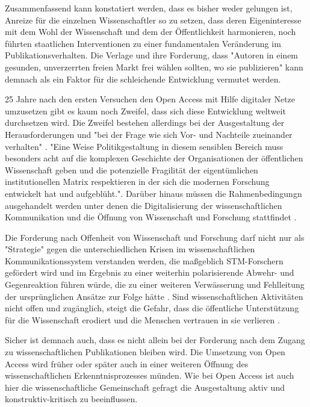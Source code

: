 Zusammenfassend kann konstatiert werden, dass es bisher weder gelungen ist, Anreize für die einzelnen Wissenschaftler so zu setzen, dass deren Eigeninteresse mit dem Wohl der Wissenschaft und dem der Öffentlichkeit harmonieren, noch führten staatlichen Interventionen zu einer fundamentalen Veränderung im Publikationsverhalten. Die Verlage und ihre Forderung, dass "Autoren in einem gesunden, unverzerrten freien Markt frei wählen sollten, wo sie publizieren" \cite{Brussels_Declaration_2007} kann demnach als ein Faktor für die schleichende Entwicklung vermutet werden.

25 Jahre nach den ersten Versuchen den Open Access mit Hilfe digitaler Netze umzusetzen gibt es kaum noch Zweifel, dass sich diese Entwicklung weltweit durchsetzen wird. Die Zweifel bestehen allerdings bei der Ausgestaltung der Herausforderungen und "bei der Frage wie sich Vor- und Nachteile zueinander verhalten" \cite{hagner_2015_sache_buches}. "Eine Weise Politikgestaltung in diesem sensiblen Bereich muss besonders acht auf die komplexen Geschichte der Organisationen der öffentlichen Wissenschaft geben und die potenzielle Fragilität der eigentümlichen institutionellen Matrix respektieren in der sich die modernen Forschung entwickelt hat und aufgeblüht."\cite{david1998_common}. Darüber hinaus müssen die Rahmenbedingungn ausgehandelt werden unter denen die Digitalisierung der wissenschaftlichen Kommunikation und die Öffnung von Wissenschaft und Forschung stattfindet \cite{mennes_2013_making_os}.

Die Forderung nach Offenheit von Wissenschaft und Forschung darf nicht nur als "Strategie" gegen die unterschiedlichen Krisen im wissenschaftlichen Kommunikationssystem verstanden werden, die maßgeblich STM-Forschern gefördert wird und im Ergebnis zu einer weiterhin polarisierende Abwehr- und Gegenreaktion führen würde, die zu einer weiteren Verwässerung und Fehlleitung der ursprünglichen Ansätze zur Folge hätte \cite{naeder_2010_open}. Sind wissenschaftlichen Aktivitäten nicht offen und zugänglich, steigt die Gefahr, dass die öffentliche Unterstützung für die Wissenschaft erodiert und die Menschen vertrauen in sie verlieren \cite{resnik_2005_ethics}.

Sicher ist demnach auch, dass es nicht allein bei der Forderung nach dem Zugang zu wissenschaftlichen Publikationen bleiben wird. Die Umsetzung von Open Access wird früher oder später auch in einer weiteren Öffnung des wissenschaftlichen Erkenntnisprozesses münden. Wie bei Open Access ist auch hier die wissenschaftliche Gemeinschaft gefragt die Ausgestaltung aktiv und konstruktiv-kritisch zu beeinflussen.

